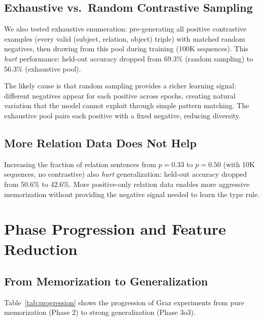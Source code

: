 \documentclass[11pt]{article}
\begin{document}
\subsection{Exhaustive vs.\ Random Contrastive Sampling}

We also tested exhaustive enumeration: pre-generating all positive contrastive examples
(every valid (subject, relation, object) triple) with matched random negatives, then
drawing from this pool during training (100K sequences). This \emph{hurt} performance:
held-out accuracy dropped from 69.3\% (random sampling) to 56.3\% (exhaustive pool).

The likely cause is that random sampling provides a richer learning signal: different
negatives appear for each positive across epochs, creating natural variation that the
model cannot exploit through simple pattern matching. The exhaustive pool pairs each
positive with a fixed negative, reducing diversity.

\subsection{More Relation Data Does Not Help}

Increasing the fraction of relation sentences from $p = 0.33$ to $p = 0.50$ (with 10K
sequences, no contrastive) also \emph{hurt} generalization: held-out accuracy dropped
from 50.6\% to 42.6\%. More positive-only relation data enables more aggressive
memorization without providing the negative signal needed to learn the type rule.

\section{Phase Progression and Feature Reduction}
\label{app:progression}

\subsection{From Memorization to Generalization}

Table~\ref{tab:progression} shows the progression of Graz experiments from pure
memorization (Phase 2) to strong generalization (Phase 3o3).
\end{document}
